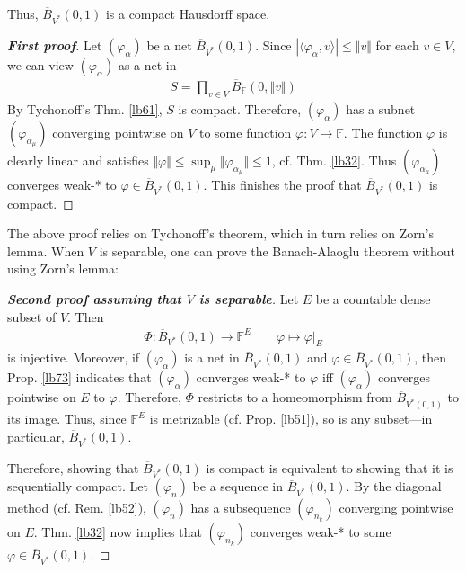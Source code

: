 \documentclass[12pt,b5paper,notitlepage]{article}
\theoremstyle{definition}
\theoremstyle{plain}
\newcommand{\ovl}{\overline}
\newcommand{\bk}[1]{\langle {#1}\rangle}
\newcommand{\Fbb}{\mathbb F}
\numberwithin{equation}{section}
\begin{document}
Thus, $\ovl B_{V^*}(0,1)$ is a compact Hausdorff space.


\begin{proof}[\textbf{First proof}]
Let $(\varphi_\alpha)$ be a net $\ovl B_{V^*}(0,1)$. Since $|\bk{\varphi_\alpha,v}|\leq\Vert v\Vert$ for each $v\in V$, we can view $(\varphi_\alpha)$ as a net in
\begin{align*}
S=\prod_{v\in V} \ovl B_\Fbb(0,\Vert v\Vert)
\end{align*}
By Tychonoff's Thm. \ref{lb61}, $S$ is compact. Therefore, $(\varphi_\alpha)$ has a subnet $(\varphi_{\alpha_\mu})$ converging pointwise on $V$ to some function $\varphi:V\rightarrow\Fbb$. The function $\varphi$ is clearly linear and satisfies $\Vert\varphi\Vert\leq\sup_\mu\Vert\varphi_{\alpha_\mu}\Vert\leq 1$, cf. Thm. \ref{lb32}.  Thus $(\varphi_{\alpha_\mu})$ converges weak-* to $\varphi\in\ovl B_{V^*}(0,1)$. This finishes the proof that $\ovl B_{V^*}(0,1)$ is compact.
\end{proof}

The above proof relies on Tychonoff's theorem, which in turn relies on Zorn's lemma. When $V$ is separable, one can prove the Banach-Alaoglu theorem without using Zorn's lemma:

\begin{proof}[\textbf{Second proof assuming that $V$ is separable}]
Let $E$ be a countable dense subset of $V$. Then
\begin{align*}
\Phi:\ovl B_{V^*}(0,1)\rightarrow\Fbb^E\qquad\varphi\mapsto\varphi|_E
\end{align*}
is injective. Moreover, if $(\varphi_\alpha)$ is a net in $\ovl B_{V^*}(0,1)$ and $\varphi\in\ovl B_{V^*}(0,1)$, then Prop. \ref{lb73} indicates that $(\varphi_\alpha)$ converges weak-* to $\varphi$ iff $(\varphi_\alpha)$ converges pointwise on $E$ to $\varphi$. Therefore, $\Phi$ restricts to a homeomorphism from $\ovl B_{V^*(0,1)}$ to its image. Thus, since $\Fbb^E$ is metrizable (cf. Prop. \ref{lb51}), so is any subset---in particular, $\ovl B_{V^*}(0,1)$. 

Therefore, showing that $\ovl B_{V^*}(0,1)$ is compact is equivalent to showing that it is sequentially compact. Let $(\varphi_n)$ be a sequence in $\ovl B_{V^*}(0,1)$. By the diagonal method (cf. Rem. \ref{lb52}), $(\varphi_n)$ has a subsequence $(\varphi_{n_k})$ converging pointwise on $E$. Thm. \ref{lb32} now implies that $(\varphi_{n_k})$ converges weak-* to some $\varphi\in\ovl B_{V^*}(0,1)$.
\end{proof}
\end{document}
